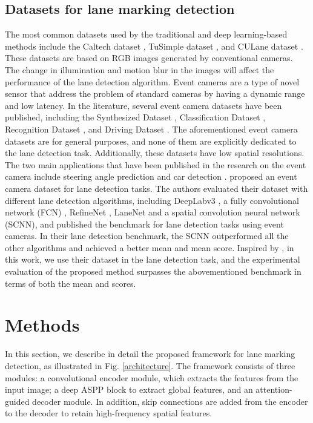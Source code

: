 \documentclass[journal]{IEEEtran}
\begin{document}
\subsection{Datasets for lane marking detection}
The most common datasets used by the traditional and deep learning-based methods include the Caltech dataset \cite{Aly2008}, TuSimple dataset \cite{tusimple}, and CULane dataset \cite{Pan2017}. These datasets are based on RGB images generated by conventional cameras. The change in illumination and motion blur in the images will affect the performance of the lane detection algorithm. Event cameras are a type of novel sensor that address the problem of standard cameras by having a dynamic range and low latency. In the literature, several event camera datasets have been published, including the Synthesized Dataset \cite{Mueggler2017}, Classification Dataset \cite{Li2017}, Recognition Dataset \cite{Hu2016}, and Driving Dataset \cite{Binas2017}. The aforementioned event camera datasets are for general purposes, and none of them are explicitly dedicated to the lane detection task. Additionally, these datasets have low spatial resolutions. The two main applications that have been published in the research on the event camera include steering angle prediction \cite{24} and car detection \cite{Chen2018}. \cite{Cheng2019} proposed an event camera dataset for lane detection tasks. The authors evaluated their dataset with different lane detection algorithms, including DeepLabv3 \cite{a4}, a fully convolutional network (FCN) \cite{Long2015}, RefineNet \cite{Lin2017}, LaneNet \cite{Wang2018} and a spatial convolution neural network (SCNN)\cite{Pan2017}, and published the benchmark for lane detection tasks using event cameras. In their lane detection benchmark, the SCNN \cite{Pan2017} outperformed all the other algorithms and achieved a better mean  and mean  score. Inspired by \cite{Cheng2019}, in this work, we use their dataset in the lane detection task, and the experimental evaluation of the proposed method surpasses the abovementioned benchmark in terms of both the mean  and  scores.


\section{Methods}
In this section, we describe in detail the proposed framework for lane marking detection, as illustrated in Fig. \ref{architecture}. The framework consists of three modules: a convolutional encoder module, which extracts the features from the input image; a deep ASPP block to extract global features, and an attention-guided decoder module. In addition, skip connections are added from the encoder to the decoder to retain high-frequency spatial features.
\end{document}
